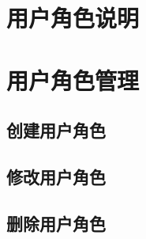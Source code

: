 
\section{用户角色说明} 
\label{sec:role_intro}


\section{用户角色管理} 
\label{sec:role_manage}


\subsection{创建用户角色} 
\label{sub:role_add}


\subsection{修改用户角色} 
\label{sub:role_modi}


\subsection{删除用户角色} 
\label{sub:role_del}

